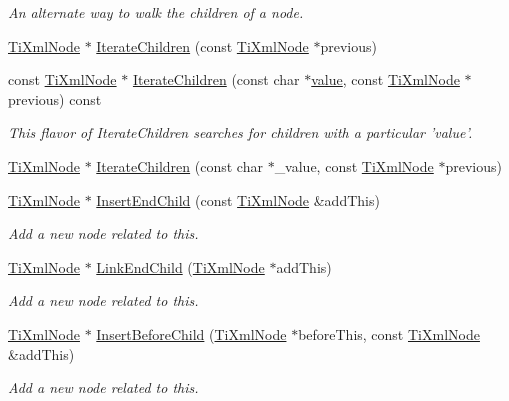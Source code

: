 \begin{DoxyCompactItemize}
\begin{DoxyCompactList}\small\item\em An alternate way to walk the children of a node. \end{DoxyCompactList}\item 
\hyperlink{class_ti_xml_node}{TiXmlNode} $\ast$ \hyperlink{class_ti_xml_node_a2358e747118fdbf0e467b1e4f7d03de1}{IterateChildren} (const \hyperlink{class_ti_xml_node}{TiXmlNode} $\ast$previous)
\item 
const \hyperlink{class_ti_xml_node}{TiXmlNode} $\ast$ \hyperlink{class_ti_xml_node_af2b86dbe25d3d26fa48180edc5e2a9fc}{IterateChildren} (const char $\ast$\hyperlink{class_ti_xml_node_ab068eb0e3311ba1b5a132abe60a9c3c8}{value}, const \hyperlink{class_ti_xml_node}{TiXmlNode} $\ast$previous) const 
\begin{DoxyCompactList}\small\item\em This flavor of IterateChildren searches for children with a particular 'value'. \end{DoxyCompactList}\item 
\hyperlink{class_ti_xml_node}{TiXmlNode} $\ast$ \hyperlink{class_ti_xml_node_a67ba8275e533e6f76340236c42ea0aea}{IterateChildren} (const char $\ast$\_\-value, const \hyperlink{class_ti_xml_node}{TiXmlNode} $\ast$previous)
\item 
\hyperlink{class_ti_xml_node}{TiXmlNode} $\ast$ \hyperlink{class_ti_xml_node_af287a913ce46d8dbf7ef24fec69bbaf0}{InsertEndChild} (const \hyperlink{class_ti_xml_node}{TiXmlNode} \&addThis)
\begin{DoxyCompactList}\small\item\em Add a new node related to this. \end{DoxyCompactList}\item 
\hyperlink{class_ti_xml_node}{TiXmlNode} $\ast$ \hyperlink{class_ti_xml_node_a1a881212554b759865f6cac79a851d38}{LinkEndChild} (\hyperlink{class_ti_xml_node}{TiXmlNode} $\ast$addThis)
\begin{DoxyCompactList}\small\item\em Add a new node related to this. \end{DoxyCompactList}\item 
\hyperlink{class_ti_xml_node}{TiXmlNode} $\ast$ \hyperlink{class_ti_xml_node_a71e54e393336382bc9875f64aab5cb15}{InsertBeforeChild} (\hyperlink{class_ti_xml_node}{TiXmlNode} $\ast$beforeThis, const \hyperlink{class_ti_xml_node}{TiXmlNode} \&addThis)
\begin{DoxyCompactList}\small\item\em Add a new node related to this. \end{DoxyCompactList}\item 

\end{DoxyCompactItemize}
